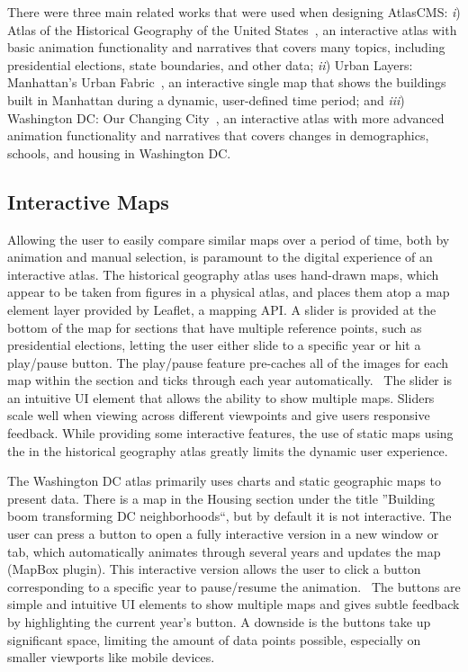 \documentclass[11pt, final, conference, twocolumn]{IEEEtran}
\begin{document}
There were three main related works that were used when designing AtlasCMS: {\it i}) Atlas of the Historical Geography of the United States~\cite{us-historical-atlas-2014}, an interactive atlas with basic animation functionality and narratives that covers many topics, including presidential elections, state boundaries, and other data; {\it ii}) Urban Layers: Manhattan's Urban Fabric~\cite{urban-layers-2014}, an interactive single map that shows the buildings built in Manhattan during a dynamic, user-defined time period; and {\it iii}) Washington DC: Our Changing City~\cite{dc-changing-2014}, an interactive atlas with more advanced animation functionality and narratives that covers changes in demographics, schools, and housing in Washington DC.

\subsection{Interactive Maps}
Allowing the user to easily compare similar maps over a period of time, both by animation and manual selection, is paramount to the digital experience of an interactive atlas. The historical geography atlas uses hand-drawn maps, which appear to be taken from figures in a physical atlas, and places them atop a map element layer provided by Leaflet, a mapping API. A slider is provided at the bottom of the map for sections that have multiple reference points, such as presidential elections, letting the user either slide to a specific year or hit a play/pause button.  The play/pause feature pre-caches all of the images for each map within the section and ticks through each year automatically.~\cite{us-historical-atlas-2014} The slider is an intuitive UI element that allows the ability to show multiple maps. Sliders scale well when viewing across different viewpoints and give users responsive feedback. While providing some interactive features, the use of static maps using the in the historical geography atlas greatly limits the dynamic user experience.

The Washington DC atlas primarily uses charts and static geographic maps to present data. There is a map in the Housing section under the title ''Building boom transforming DC neighborhoods``, but by default it is not interactive. The user can press a button to open a fully interactive version in a new window or tab, which automatically animates through several years and updates the map (MapBox plugin). This interactive version allows the user to click a button corresponding to a specific year to pause/resume the animation.~\cite{dc-changing-2014} The buttons are simple and intuitive UI elements to show multiple maps and gives subtle feedback by highlighting the current year's button. A downside is the buttons take up significant space, limiting the amount of data points possible, especially on smaller viewports like mobile devices.
\end{document}

